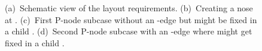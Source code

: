 \documentclass[a4paper,twoside,11pt]{article}
\begin{document}
\begin{figure}[t]
    \centering
    \begin{minipage}[b]{.24\textwidth}
        \centering
    \end{minipage}
    \hfill
    \begin{minipage}[b]{.24\textwidth}
        \centering
    \end{minipage}
    \hfill
    \begin{minipage}[b]{.24\textwidth}
        \centering
    \end{minipage}
    \hfill
    \begin{minipage}[b]{.24\textwidth}
        \centering
    \end{minipage}
    \caption{
    (a)~Schematic view of the layout requirements.
    (b)~Creating a nose at .
    (c)~First P-node subcase without an -edge but  might be fixed in a child .
    (d)~Second P-node subcase with an -edge where  might get fixed in a child .}
    \label{fig:4p_requirements}
\end{figure}
\end{document}
